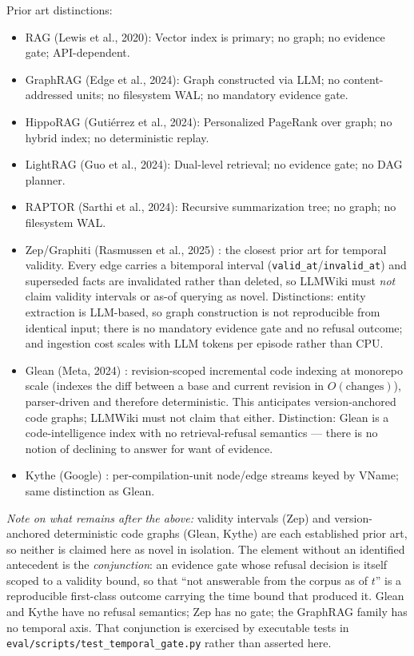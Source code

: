 \begin{patentdiscussion}
Prior art distinctions:
\begin{itemize}
  \item RAG (Lewis et al., 2020): Vector index is primary; no graph; no evidence gate; API-dependent.
  \item GraphRAG (Edge et al., 2024): Graph constructed via LLM; no content-addressed units; no filesystem WAL; no mandatory evidence gate.
  \item HippoRAG (Guti{\'e}rrez et al., 2024): Personalized PageRank over graph; no hybrid index; no deterministic replay.
  \item LightRAG (Guo et al., 2024): Dual-level retrieval; no evidence gate; no DAG planner.
  \item RAPTOR (Sarthi et al., 2024): Recursive summarization tree; no graph; no filesystem WAL.
  \item Zep/Graphiti (Rasmussen et al., 2025) \cite{rasmussen2025zep}: the closest prior art for temporal validity. Every edge carries a bitemporal interval (\texttt{valid\_at}/\texttt{invalid\_at}) and superseded facts are invalidated rather than deleted, so LLMWiki must \emph{not} claim validity intervals or as-of querying as novel. Distinctions: entity extraction is LLM-based, so graph construction is not reproducible from identical input; there is no mandatory evidence gate and no refusal outcome; and ingestion cost scales with LLM tokens per episode rather than CPU.
  \item Glean (Meta, 2024) \cite{meta2024glean}: revision-scoped incremental code indexing at monorepo scale (indexes the diff between a base and current revision in $O(\text{changes})$), parser-driven and therefore deterministic. This anticipates version-anchored code graphs; LLMWiki must not claim that either. Distinction: Glean is a code-intelligence index with no retrieval-refusal semantics --- there is no notion of declining to answer for want of evidence.
  \item Kythe (Google) \cite{google_kythe}: per-compilation-unit node/edge streams keyed by VName; same distinction as Glean.
\end{itemize}

\par\noindent\emph{Note on what remains after the above:} validity intervals (Zep) and version-anchored deterministic code graphs (Glean, Kythe) are each established prior art, so neither is claimed here as novel in isolation. The element without an identified antecedent is the \emph{conjunction}: an evidence gate whose refusal decision is itself scoped to a validity bound, so that ``not answerable from the corpus as of $t$'' is a reproducible first-class outcome carrying the time bound that produced it. Glean and Kythe have no refusal semantics; Zep has no gate; the GraphRAG family has no temporal axis. That conjunction is exercised by executable tests in \texttt{eval/scripts/test\_temporal\_gate.py} rather than asserted here.
\end{patentdiscussion}

